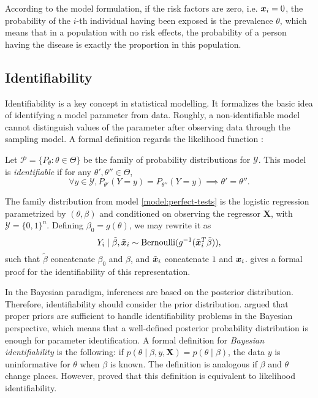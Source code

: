 \begin{remark}
  \label{remark:interpretation-prevalence}
  According to the model formulation, if the risk factors are zero, i.e. $\boldsymbol{x}_i
    = 0$, the probability of the $i$-th individual having been exposed is the prevalence $\theta$, which means that in
  a population with no risk effects, the probability of a person having the
  disease is exactly the proportion in this population.
\end{remark}

\subsection{Identifiability}
\label{sec:perfect-test-identifiability}

Identifiability is a key concept in statistical modelling. It formalizes the 
basic idea of identifying a model parameter from data. Roughly, a non-identifiable
model cannot distinguish values of the parameter after observing data through
the sampling model. A formal definition regards the likelihood function \cite[p.
  3459]{xie2006measures}:

\begin{definition}
  \label{def:identifiability}
  Let $\mathcal{P} = \{P_{\theta} : \theta \in \Theta\}$ be
  the family of probability distributions for $\mathcal{Y}$. This model is
    {\em identifiable} if for any $\theta', \theta'' \in
    \Theta$,
  $$\forall y \in \mathcal{Y}, P_{\theta'}(Y = y) =
    P_{\theta''}(Y = y) \implies
    \theta' = \theta''.$$
\end{definition}

The family distribution from model \eqref{model:perfect-tests} is the logistic
regression parametrized by $(\theta, \beta)$ and conditioned on
observing the regressor $\boldsymbol{X}$, with $\mathcal{Y} = \{0,1\}^n$. Defining $\beta_0 =
  g(\theta)$, we may rewrite it as
$$Y_i \mid \tilde{\beta}, \tilde{\boldsymbol{x}}_i \sim \operatorname{Bernoulli}(g^{-1}(\tilde{\boldsymbol{x}}_i^T\tilde{\beta})),$$
such that $\tilde{\beta}$ concatenate $\beta_0$ and $\beta$, and $\tilde{\boldsymbol{x}}_i$
concatenate $1$ and $\boldsymbol{x}_i$. \textcite[p. 7]{kuchenhoff1995identification}
gives a formal proof for the identifiability of this representation.

In the Bayesian paradigm, inferences are based on the posterior distribution.
Therefore, identifiability should consider the prior distribution.
\textcite[p. 46]{lindley1972bayesian}  argued that proper priors are
sufficient to handle
identifiability problems in the Bayesian perspective, which means that a
well-defined posterior probability distribution is enough for parameter
identification. A formal definition for {\em Bayesian identifiability} is the
following: if $p(\theta \mid \beta, y, \boldsymbol{X}) = p(\theta \mid
  \beta)$, the data $y$ is uninformative for $\theta$ when $\beta$ is known.
The definition is analogous if $\beta$ and $\theta$ change places. However,
\textcite[p. 248]{gelfand1999identifiability} proved that this definition is equivalent to
likelihood identifiability.

